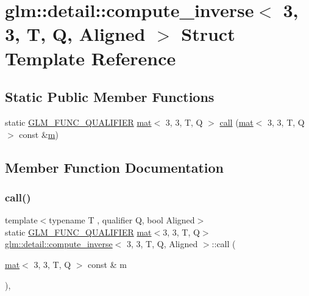\hypertarget{structglm_1_1detail_1_1compute__inverse_3_013_00_013_00_01_t_00_01_q_00_01_aligned_01_4}{}\section{glm\+:\+:detail\+:\+:compute\+\_\+inverse$<$ 3, 3, T, Q, Aligned $>$ Struct Template Reference}
\label{structglm_1_1detail_1_1compute__inverse_3_013_00_013_00_01_t_00_01_q_00_01_aligned_01_4}
\subsection*{Static Public Member Functions}
\begin{DoxyCompactItemize}
\item 
static \mbox{\hyperlink{setup_8hpp_a33fdea6f91c5f834105f7415e2a64407}{G\+L\+M\+\_\+\+F\+U\+N\+C\+\_\+\+Q\+U\+A\+L\+I\+F\+I\+ER}} \mbox{\hyperlink{structglm_1_1mat}{mat}}$<$ 3, 3, T, Q $>$ \mbox{\hyperlink{structglm_1_1detail_1_1compute__inverse_3_013_00_013_00_01_t_00_01_q_00_01_aligned_01_4_a55c36db03fba738434c3f47b6a794ae7}{call}} (\mbox{\hyperlink{structglm_1_1mat}{mat}}$<$ 3, 3, T, Q $>$ const \&\mbox{\hyperlink{_s_d_l__opengl__glext_8h_af593500c283bf1a787a6f947f503a5c2}{m}})
\end{DoxyCompactItemize}


\subsection{Member Function Documentation}
\mbox{\label{structglm_1_1detail_1_1compute__inverse_3_013_00_013_00_01_t_00_01_q_00_01_aligned_01_4_a55c36db03fba738434c3f47b6a794ae7}} 
\subsubsection{\texorpdfstring{call()}{call()}}
{\footnotesize\ttfamily template$<$typename T , qualifier Q, bool Aligned$>$ \\
static \mbox{\hyperlink{setup_8hpp_a33fdea6f91c5f834105f7415e2a64407}{G\+L\+M\+\_\+\+F\+U\+N\+C\+\_\+\+Q\+U\+A\+L\+I\+F\+I\+ER}} \mbox{\hyperlink{structglm_1_1mat}{mat}}$<$3, 3, T, Q$>$ \mbox{\hyperlink{structglm_1_1detail_1_1compute__inverse}{glm\+::detail\+::compute\+\_\+inverse}}$<$ 3, 3, T, Q, Aligned $>$\+::call (\begin{DoxyParamCaption}\item[{\mbox{\hyperlink{structglm_1_1mat}{mat}}$<$ 3, 3, T, Q $>$ const \&}]{m }\end{DoxyParamCaption})\hspace{0.3cm}{\ttfamily [inline]}, {\ttfamily [static]}}



